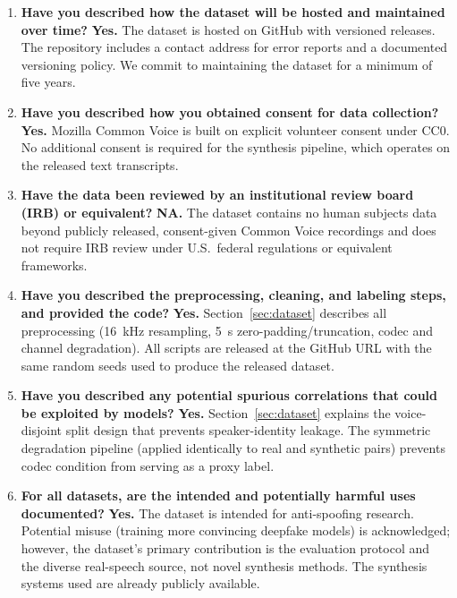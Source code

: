 \documentclass{article}
\begin{document}
\begin{enumerate}
  \item \textbf{Have you described how the dataset will be hosted and
    maintained over time?}
    \textbf{Yes.}  The dataset is hosted on GitHub with versioned releases.
    The repository includes a contact address for error reports and a
    documented versioning policy.  We commit to maintaining the dataset for
    a minimum of five years.

  \item \textbf{Have you described how you obtained consent for data
    collection?}
    \textbf{Yes.}  Mozilla Common Voice is built on explicit volunteer
    consent under CC0.  No additional consent is required for the synthesis
    pipeline, which operates on the released text transcripts.

  \item \textbf{Have the data been reviewed by an institutional review
    board (IRB) or equivalent?}
    \textbf{NA.}  The dataset contains no human subjects data beyond
    publicly released, consent-given Common Voice recordings and does not
    require IRB review under U.S.\ federal regulations or equivalent
    frameworks.

  \item \textbf{Have you described the preprocessing, cleaning, and
    labeling steps, and provided the code?}
    \textbf{Yes.}  Section~\ref{sec:dataset} describes all preprocessing
    (16~kHz resampling, 5~s zero-padding/truncation, codec and channel degradation).
    All scripts are released at the GitHub URL with the same random seeds
    used to produce the released dataset.

  \item \textbf{Have you described any potential spurious correlations that
    could be exploited by models?}
    \textbf{Yes.}  Section~\ref{sec:dataset} explains the voice-disjoint
    split design that prevents speaker-identity leakage.  The symmetric
    degradation pipeline (applied identically to real and synthetic pairs)
    prevents codec condition from serving as a proxy label.

  \item \textbf{For all datasets, are the intended and potentially
    harmful uses documented?}
    \textbf{Yes.}  The dataset is intended for anti-spoofing research.
    Potential misuse (training more convincing deepfake models) is
    acknowledged; however, the dataset's primary contribution is the
    evaluation protocol and the diverse real-speech source, not novel
    synthesis methods.  The synthesis systems used are already publicly
    available.


\end{enumerate}
\end{document}
